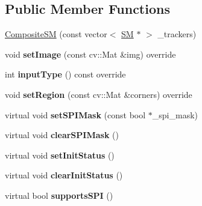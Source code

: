 \subsection*{Public Member Functions}
\begin{DoxyCompactItemize}
\item 
\hyperlink{classCompositeSM_aa1d6d6e75145ebb87fb6c3ecf3134e05}{Composite\-S\-M} (const vector$<$ \hyperlink{classSearchMethod}{S\-M} $\ast$ $>$ \-\_\-trackers)
\item 
\hypertarget{classCompositeSM_a20316a95a57e6f6b75e24c4a66719a97}{void {\bfseries set\-Image} (const cv\-::\-Mat \&img) override}\label{classCompositeSM_a20316a95a57e6f6b75e24c4a66719a97}

\item 
\hypertarget{classCompositeSM_a72bc8a97252dce2bd5b541a8609bb33e}{int {\bfseries input\-Type} () const override}\label{classCompositeSM_a72bc8a97252dce2bd5b541a8609bb33e}

\item 
\hypertarget{classCompositeSM_adb512c8b6d82fbd653a48ac3d2ad9357}{void {\bfseries set\-Region} (const cv\-::\-Mat \&corners) override}\label{classCompositeSM_adb512c8b6d82fbd653a48ac3d2ad9357}

\item 
\hypertarget{classCompositeSM_ab4c4232cf45b68f31ebe25adf3d7cdb7}{virtual void {\bfseries set\-S\-P\-I\-Mask} (const bool $\ast$\-\_\-spi\-\_\-mask)}\label{classCompositeSM_ab4c4232cf45b68f31ebe25adf3d7cdb7}

\item 
\hypertarget{classCompositeSM_ab4bd7368edaaa850f75853182d733ec0}{virtual void {\bfseries clear\-S\-P\-I\-Mask} ()}\label{classCompositeSM_ab4bd7368edaaa850f75853182d733ec0}

\item 
\hypertarget{classCompositeSM_a2294250c4d7b9bbbb8b016e9bb47b683}{virtual void {\bfseries set\-Init\-Status} ()}\label{classCompositeSM_a2294250c4d7b9bbbb8b016e9bb47b683}

\item 
\hypertarget{classCompositeSM_a32a5b6531d6383909e1ef100439e8174}{virtual void {\bfseries clear\-Init\-Status} ()}\label{classCompositeSM_a32a5b6531d6383909e1ef100439e8174}

\item 
\hypertarget{classCompositeSM_aabe055e62f83356ae9fd4853410069b4}{virtual bool {\bfseries supports\-S\-P\-I} ()}\label{classCompositeSM_aabe055e62f83356ae9fd4853410069b4}

\end{DoxyCompactItemize}
